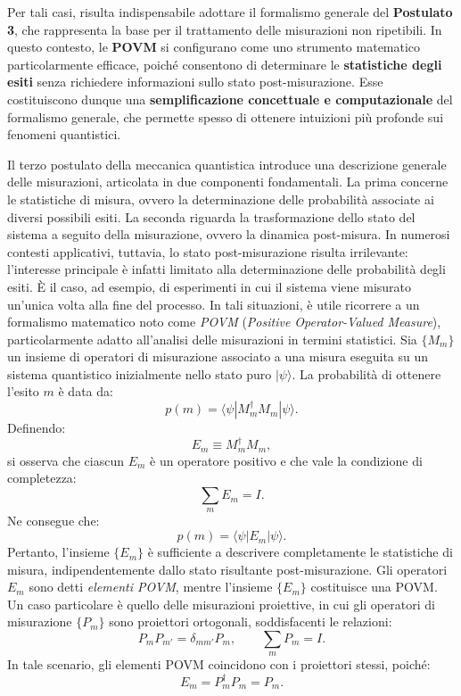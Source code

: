 \documentclass[a4paper,12pt]{report}
\theoremstyle{plain}
\begin{document}
\begin{framed}
Per tali casi, risulta indispensabile adottare il formalismo generale del \textbf{Postulato 3}, che rappresenta la base per il trattamento delle misurazioni non ripetibili. In questo contesto, le \textbf{POVM} si configurano come uno strumento matematico particolarmente efficace, poiché consentono di determinare le \textbf{statistiche degli esiti} senza richiedere informazioni sullo stato post-misurazione. Esse costituiscono dunque una \textbf{semplificazione concettuale e computazionale} del formalismo generale, che permette spesso di ottenere intuizioni più profonde sui fenomeni quantistici.
\end{framed}
\noindent Il terzo postulato della meccanica quantistica introduce una descrizione generale delle misurazioni, articolata in due componenti fondamentali. La prima concerne le statistiche di misura, ovvero la determinazione delle probabilità associate ai diversi possibili esiti. La seconda riguarda la trasformazione dello stato del sistema a seguito della misurazione, ovvero la dinamica post-misura. In numerosi contesti applicativi, tuttavia, lo stato post-misurazione risulta irrilevante: l'interesse principale è infatti limitato alla determinazione delle probabilità degli esiti. È il caso, ad esempio, di esperimenti in cui il sistema viene misurato un'unica volta alla fine del processo. In tali situazioni, è utile ricorrere a un formalismo matematico noto come \textit{POVM} (\textit{Positive Operator-Valued Measure}), particolarmente adatto all'analisi delle misurazioni in termini statistici.
Sia $\{M_m\}$ un insieme di operatori di misurazione associato a una misura eseguita su un sistema quantistico inizialmente nello stato puro $|\psi\rangle$. La probabilità di ottenere l'esito $m$ è data da:
\[
p(m) = \langle \psi | M_m^\dagger M_m | \psi \rangle.
\]
Definendo:
\[
E_m \equiv M_m^\dagger M_m,
\]
si osserva che ciascun $E_m$ è un operatore positivo e che vale la condizione di completezza:
\[
\sum_m E_m = I.
\]
Ne consegue che:
\[
p(m) = \langle \psi | E_m | \psi \rangle.
\]
Pertanto, l'insieme $\{E_m\}$ è sufficiente a descrivere completamente le statistiche di misura, indipendentemente dallo stato risultante post-misurazione. Gli operatori $E_m$ sono detti \textit{elementi POVM}, mentre l'insieme $\{E_m\}$ costituisce una POVM.
Un caso particolare è quello delle misurazioni proiettive, in cui gli operatori di misurazione $\{P_m\}$ sono proiettori ortogonali, soddisfacenti le relazioni:
\[
P_m P_{m'} = \delta_{mm'} P_m, \qquad \sum_m P_m = I.
\]
In tale scenario, gli elementi POVM coincidono con i proiettori stessi, poiché:
\[
E_m = P_m^\dagger P_m = P_m.
\]
\end{document}
